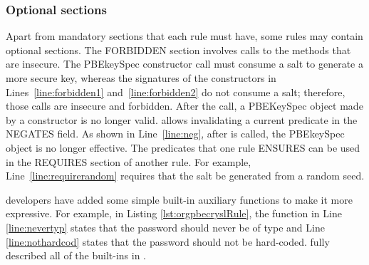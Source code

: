 \subsubsection{Optional sections}
Apart from mandatory sections that each \crysl{} rule must have, some \crysl{} rules may contain optional sections. The FORBIDDEN section involves calls to the methods that are insecure. The PBEkeySpec constructor call must consume a salt to generate a more secure key, whereas the signatures of the constructors in Lines~\ref{line:forbidden1} and~\ref{line:forbidden2} do not consume a salt; therefore, those calls are insecure and forbidden. After the  call, a PBEKeySpec object made by a constructor is no longer valid. \crysl{} allows invalidating a current predicate in the NEGATES field. As shown in Line~\ref{line:neg}, after  is called, the PBEkeySpec object is no longer effective. The predicates that one rule ENSURES can be used in the REQUIRES section of another rule. For example, Line~\ref{line:requirerandom} requires that the salt be generated from a random seed.


\crysl{} developers have added some simple built-in auxiliary functions to make it more expressive. For example, in Listing \ref{lst:orgpbecryslRule}, the function
 in Line \ref{line:nevertyp} states that the password should never be of type  and Line \ref{line:nothardcod} states that the password should not be hard-coded. \cite{stefanphd} fully described all of the built-ins in \crysl.
